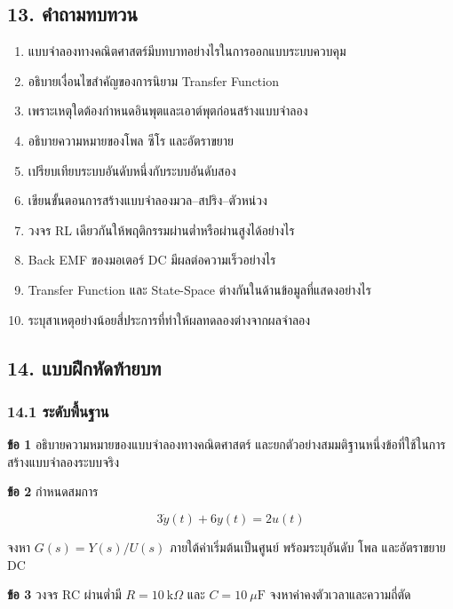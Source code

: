 \subsection{13. คำถามทบทวน}

\begin{enumerate}
    \item แบบจำลองทางคณิตศาสตร์มีบทบาทอย่างไรในการออกแบบระบบควบคุม
    \item อธิบายเงื่อนไขสำคัญของการนิยาม Transfer Function
    \item เพราะเหตุใดต้องกำหนดอินพุตและเอาต์พุตก่อนสร้างแบบจำลอง
    \item อธิบายความหมายของโพล ซีโร และอัตราขยาย
    \item เปรียบเทียบระบบอันดับหนึ่งกับระบบอันดับสอง
    \item เขียนขั้นตอนการสร้างแบบจำลองมวล–สปริง–ตัวหน่วง
    \item วงจร RL เดียวกันให้พฤติกรรมผ่านต่ำหรือผ่านสูงได้อย่างไร
    \item Back EMF ของมอเตอร์ DC มีผลต่อความเร็วอย่างไร
    \item Transfer Function และ State-Space ต่างกันในด้านข้อมูลที่แสดงอย่างไร
    \item ระบุสาเหตุอย่างน้อยสี่ประการที่ทำให้ผลทดลองต่างจากผลจำลอง
\end{enumerate}


\subsection{14. แบบฝึกหัดท้ายบท}

\subsubsection{14.1 ระดับพื้นฐาน}

\textbf{ข้อ 1} อธิบายความหมายของแบบจำลองทางคณิตศาสตร์ และยกตัวอย่างสมมติฐานหนึ่งข้อที่ใช้ในการสร้างแบบจำลองระบบจริง

\textbf{ข้อ 2} กำหนดสมการ

\[
3\dot{y}(t)+6y(t)=2u(t)
\]

จงหา $G(s)=Y(s)/U(s)$ ภายใต้ค่าเริ่มต้นเป็นศูนย์ พร้อมระบุอันดับ โพล และอัตราขยาย DC

\textbf{ข้อ 3} วงจร RC ผ่านต่ำมี $R=10\ \text{k}\Omega$ และ $C=10\ \mu\text{F}$ จงหาค่าคงตัวเวลาและความถี่ตัด

